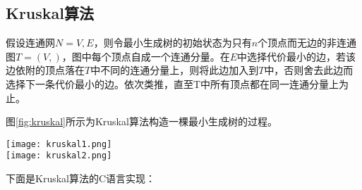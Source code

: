 \subsection{Kruskal算法}
\label{sec:kruskal}
假设连通网$N={V, E}$，则令最小生成树的初始状态为只有$n$个顶点而无边的非连通图$T=(V, {})$，图中每个顶点自成一个连通分量。在$E$中选择代价最小的边，若该边依附的顶点落在$T$中不同的连通分量上，则将此边加入到$T$中，否则舍去此边而选择下一条代价最小的边。依次类推，直至T中所有顶点都在同一连通分量上为止。

图\ref{fig:kruskal}所示为Kruskal算法构造一棵最小生成树的过程。

\begin{center}
\texttt{[image: kruskal1.png]}\\
\texttt{[image: kruskal2.png]}\\
\label{fig:kruskal}
\end{center}

下面是Kruskal算法的C语言实现：

